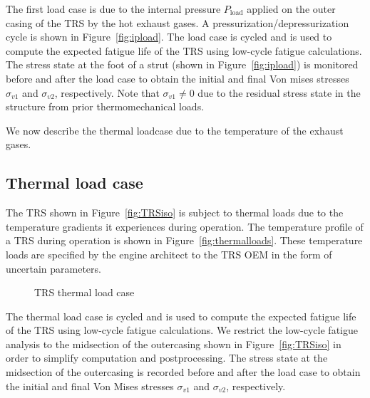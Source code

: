 The first load case is due to the internal pressure $P_{\textrm{load}}$ applied on the outer casing of the \ac{TRS} by the hot exhaust gases. A pressurization/depressurization cycle is shown in Figure~\ref{fig:ipload}. The load case is cycled and is used to compute the expected fatigue life of the \ac{TRS} using low-cycle fatigue calculations. The stress state at the foot of a strut (shown in Figure~\ref{fig:ipload}) is monitored before and after the load case to obtain the initial and final Von mises stresses $\sigma_{v1}$ and $\sigma_{v2}$, respectively. Note that $\sigma_{v1} \neq 0$ due to the residual stress state in the structure from prior thermomechanical loads. 

We now describe the thermal loadcase due to the temperature of the exhaust gases.

\subsection{Thermal load case} \label{subsec:thermalloadcase}

The \ac{TRS} shown in Figure~\ref{fig:TRSiso} is subject to thermal loads due to the temperature gradients it experiences during operation. The temperature profile of a \ac{TRS} during operation is shown in Figure~\ref{fig:thermalloads}. These temperature loads are specified by the engine architect to the \ac{TRS} \ac{OEM} in the form of uncertain parameters.

\begin{figure}[h!]
	\centering
	 \hspace{0.1\textwidth}%
	\caption{\ac{TRS} thermal load case}
	\label{fig:thermalloadcases}
\end{figure}

The thermal load case is cycled and is used to compute the expected fatigue life of the \ac{TRS} using low-cycle fatigue calculations. We restrict the low-cycle fatigue analysis to the midsection of the outercasing shown in Figure~\ref{fig:TRSiso} in order to simplify computation and postprocessing. The stress state at the midsection of the outercasing is recorded before and after the load case to obtain the initial and final Von Mises stresses $\sigma_{v1}$ and $\sigma_{v2}$, respectively. 

